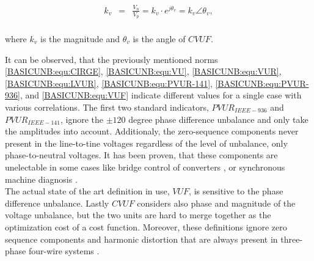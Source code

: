 \begin{equation}
        \begin{array}{rcl}
            k_v&=&\frac{V_n}{V_p}=k_v\cdot e^{j\theta_v}=k_v\angle\theta_v,\\					
        \end{array}
        \label{BASICUNB:equ:CVUF}
    \end{equation}
		
		where $k_v$ is the magnitude and $\theta_v$ is the angle of $CVUF$.
		
			It can be observed, that the previously mentioned norms \ref{BASICUNB:equ:CIRGE}, \ref{BASICUNB:equ:VU}, \ref{BASICUNB:equ:VUR}, \ref{BASICUNB:equ:LVUR}, \ref{BASICUNB:equ:PVUR-141}, \ref{BASICUNB:equ:PVUR-936}, and \ref{BASICUNB:equ:VUF}  indicate different values for a single case with various correlations. The first two standard indicators, $PVUR_{IEEE-936}$ and $PVUR_{IEEE-141}$, ignore the $\pm120$ degree phase difference unbalance and only take the amplitudes into account. Additionaly, the zero-sequence components never present in the line-to-tine voltages regardless of the level of unbalance, only phase-to-neutral voltages. It has been proven, that these components are unelectable in some cases like bridge control of converters \cite{betz2006symmetry}, or synchronous machine diagnosis \cite{hang2015online}.\\
			The actual state of the art definition in use, $VUF$, is sensitive to the phase difference unbalance. Lastly $CVUF$ considers also phase and magnitude of the voltage unbalance, but the two units are hard to merge together as the optimization cost of a cost function. Moreover, these definitions ignore zero sequence components and harmonic distortion that are always present in three-phase four-wire systems \cite{bina2011three}.
		


	

